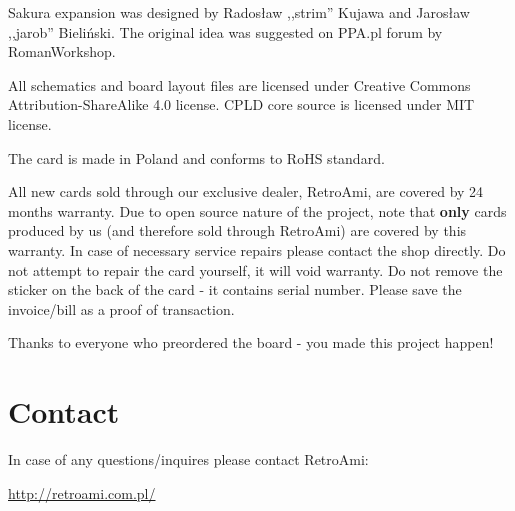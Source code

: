 \documentclass[10pt,a5paper]{article}
\begin{document}
Sakura expansion was designed by Radosław ,,strim'' Kujawa and Jarosław ,,jarob'' Bieliński. The original idea was suggested on PPA.pl forum by RomanWorkshop. 

All schematics and board layout files are licensed under Creative Commons Attribution-ShareAlike 4.0 license. CPLD core source is licensed under MIT license.

The card is made in Poland and conforms to RoHS standard. 

All new cards sold through our exclusive dealer, RetroAmi, are covered by 24 months warranty. Due to open source nature of the project, note that {\bf only} cards produced by us (and therefore sold through RetroAmi) are covered by this warranty. In case of necessary service repairs please contact the shop directly. Do not attempt to repair the card yourself, it will void warranty. Do not remove the sticker on the back of the card - it contains serial number. Please save the invoice/bill as a proof of transaction.

Thanks to everyone who preordered the board - you made this project happen!

\section*{Contact}

In case of any questions/inquires please contact RetroAmi:

\url{http://retroami.com.pl/} 
\end{document}
